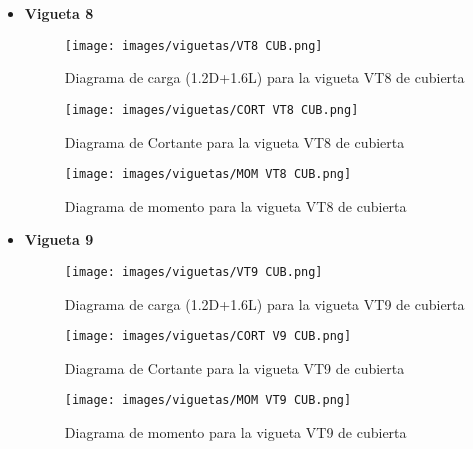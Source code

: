 \begin{itemize}
              \item \textbf{Vigueta 8}\\
        \begin{figure}[H]
                \centering
                \texttt{[image: images/viguetas/VT8 CUB.png]} 
                \caption{Diagrama de carga (1.2D+1.6L) para la vigueta VT8 de cubierta}
                \label{fig:W VT8 CUB}
            \end{figure}
            
            \begin{figure}[H]
                \centering
                \texttt{[image: images/viguetas/CORT VT8 CUB.png]}
                \caption{Diagrama de Cortante para la vigueta VT8 de cubierta}
                \label{fig:v VT8 CUB}
            \end{figure}
            
             \begin{figure}[H]
                \centering
                \texttt{[image: images/viguetas/MOM VT8 CUB.png]} 
                \caption{Diagrama de momento para la vigueta VT8 de cubierta}
                \label{fig:M VT8 CUB}
            \end{figure}
            
            
             \item \textbf{Vigueta 9}\\
        \begin{figure}[H]
                \centering
                \texttt{[image: images/viguetas/VT9 CUB.png]} 
                \caption{Diagrama de carga (1.2D+1.6L) para la vigueta VT9 de cubierta}
                \label{fig:W VT9 CUB}
            \end{figure}
            
            \begin{figure}[H]
                \centering
                \texttt{[image: images/viguetas/CORT V9 CUB.png]}
                \caption{Diagrama de Cortante para la vigueta VT9 de cubierta}
                \label{fig:v VT9 CUB}
            \end{figure}
            
             \begin{figure}[H]
                \centering
                \texttt{[image: images/viguetas/MOM VT9 CUB.png]} 
                \caption{Diagrama de momento para la vigueta VT9 de cubierta}
                \label{fig:M VT9 CUB}
            \end{figure}
            

\end{itemize}
